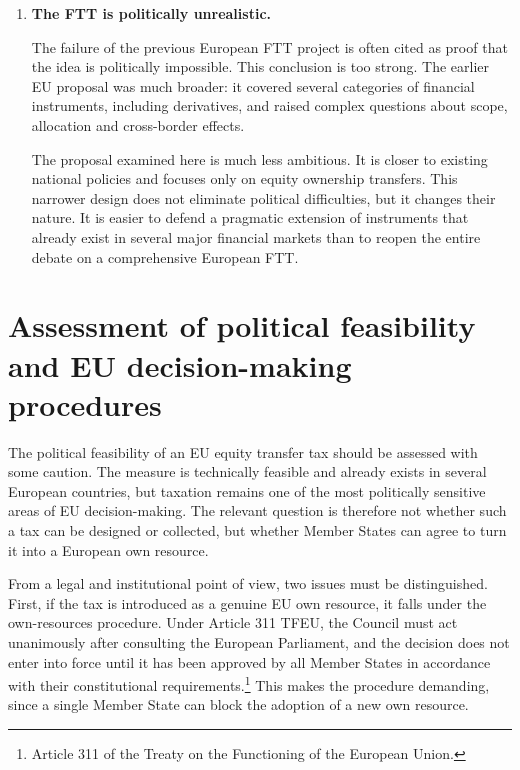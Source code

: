 \documentclass[../../main]{subfiles}
\begin{document}
\begin{enumerate}
    As one component of a broader package, an equity transfer tax has several advantages: it is already tested, it can raise revenue from a large and highly internationalised tax base, it has a redistributive profile, and it is connected to an activity that is currently only lightly taxed relative to its scale. It is therefore a plausible and coherent own-resource candidate.

    \item \textbf{The FTT is politically unrealistic.}

    The failure of the previous European FTT project is often cited as proof that the idea is politically impossible. This conclusion is too strong. The earlier EU proposal was much broader: it covered several categories of financial instruments, including derivatives, and raised complex questions about scope, allocation and cross-border effects.

    The proposal examined here is much less ambitious. It is closer to existing national policies and focuses only on equity ownership transfers. This narrower design does not eliminate political difficulties, but it changes their nature. It is easier to defend a pragmatic extension of instruments that already exist in several major financial markets than to reopen the entire debate on a comprehensive European FTT.

\end{enumerate}


\section{Assessment of political feasibility and EU decision-making procedures}

The political feasibility of an EU equity transfer tax should be assessed with some caution. The measure is technically feasible and already exists in several European countries, but taxation remains one of the most politically sensitive areas of EU decision-making. The relevant question is therefore not whether such a tax can be designed or collected, but whether Member States can agree to turn it into a European own resource.

From a legal and institutional point of view, two issues must be distinguished. First, if the tax is introduced as a genuine EU own resource, it falls under the own-resources procedure. Under Article 311 TFEU, the Council must act unanimously after consulting the European Parliament, and the decision does not enter into force until it has been approved by all Member States in accordance with their constitutional requirements.\footnote{Article 311 of the Treaty on the Functioning of the European Union.} This makes the procedure demanding, since a single Member State can block the adoption of a new own resource.
\end{document}
